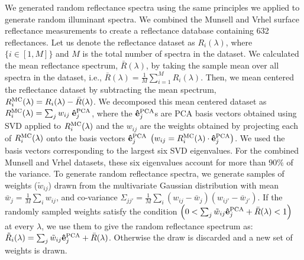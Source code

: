 \documentclass{jov}
\begin{document}
We generated random reflectance spectra using the same principles we applied to generate random illuminant spectra.
We combined the Munsell \cite{kelly1943tristimulus} and Vrhel \cite{vrhel1994measurement} surface reflectance 
measurements to create a reflectance database containing 632 reflectances. 
Let us denote the reflectance dataset as $R_i(\lambda)$, where $\{i \in [1,M]\}$ 
and $M$ is the total number of spectra in the dataset. 
We calculated the mean reflectance spectrum,
$\bar{R}(\lambda)$, by taking the sample mean over all spectra in the dataset, i.e.,
$\bar{R}(\lambda) = \frac{1}{M} \sum_{i=1}^M R_i(\lambda)$. Then, we mean centered 
the reflectance dataset by subtracting the mean spectrum, $R_i^{\rm MC}(\lambda) =  R_i(\lambda)-\bar{R}(\lambda)$. 
We decomposed this mean centered dataset as $R_i^{\rm MC}(\lambda) = \sum_j{w_{ij} \; {\bf \hat{e}}_j^{\rm PCA}}$, where
the ${\bf \hat{e}}_j^{\rm PCA}$s are PCA basis vectors obtained using SVD applied to $R_i^{\rm MC}(\lambda)$
and the $w_{ij}$ are the weights obtained by projecting each of $R_i^{\rm MC}(\lambda)$ onto the basis vectors ${\bf \hat{e}}_j^{\rm PCA}$ 
$\left( w_{ij} = R_i^{\rm MC}(\lambda)\cdot {\bf \hat{e}}_j^{\rm PCA}\right)$. 
We used the basis vectors corresponding to the largest six SVD eigenvalues. 
For the combined Munsell and Vrhel datasets, these six eigenvalues account for 
more than $90\%$ of the variance. 
To generate random reflectance spectra, we generate samples of weights ($\tilde{w}_{ij}$) drawn from the multivariate Gaussian 
distribution with mean $\bar{w}_j = \frac{1}{M}\sum_i w_{ij}$, 
and co-variance $\Sigma_{jj'} = \frac{1}{M} \sum_i \left(w_{ij} -\bar{w}_j\right)\left(w_{ij'} -\bar{w}_{j'}\right) $. If the randomly sampled weights satisfy the condition $\left( 0 < \sum_j \tilde{w}_{ij}{\bf \hat{e}}_j^{\rm PCA} + \bar{R}(\lambda)<1\right) $ at every $\lambda$, we use them to give the random reflectance spectrum as: $\tilde{R}_i(\lambda) =\sum_j \tilde{w}_{ij}{\bf \hat{e}}_j^{\rm PCA} + \bar{R}(\lambda)$.  Otherwise the draw is discarded and a new set of weights is drawn.
\end{document}
